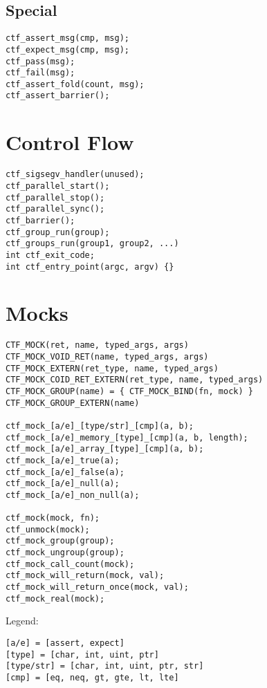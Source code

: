 \documentclass[12pt]{article}
\begin{document}
\subsection{Special}
\begin{verbatim}
ctf_assert_msg(cmp, msg);
ctf_expect_msg(cmp, msg);
ctf_pass(msg);
ctf_fail(msg);
ctf_assert_fold(count, msg);
ctf_assert_barrier();
\end{verbatim}
\section{Control Flow}
\begin{verbatim}
ctf_sigsegv_handler(unused);
ctf_parallel_start();
ctf_parallel_stop();
ctf_parallel_sync();
ctf_barrier();
ctf_group_run(group);
ctf_groups_run(group1, group2, ...)
int ctf_exit_code;
int ctf_entry_point(argc, argv) {}
\end{verbatim}
\section{Mocks}
\begin{verbatim}
CTF_MOCK(ret, name, typed_args, args)
CTF_MOCK_VOID_RET(name, typed_args, args)
CTF_MOCK_EXTERN(ret_type, name, typed_args)
CTF_MOCK_COID_RET_EXTERN(ret_type, name, typed_args)
CTF_MOCK_GROUP(name) = { CTF_MOCK_BIND(fn, mock) }
CTF_MOCK_GROUP_EXTERN(name)

ctf_mock_[a/e]_[type/str]_[cmp](a, b);
ctf_mock_[a/e]_memory_[type]_[cmp](a, b, length);
ctf_mock_[a/e]_array_[type]_[cmp](a, b);
ctf_mock_[a/e]_true(a);
ctf_mock_[a/e]_false(a);
ctf_mock_[a/e]_null(a);
ctf_mock_[a/e]_non_null(a);

ctf_mock(mock, fn);
ctf_unmock(mock);
ctf_mock_group(group);
ctf_mock_ungroup(group);
ctf_mock_call_count(mock);
ctf_mock_will_return(mock, val);
ctf_mock_will_return_once(mock, val);
ctf_mock_real(mock);
\end{verbatim}
Legend:
\begin{verbatim}
[a/e] = [assert, expect]
[type] = [char, int, uint, ptr]
[type/str] = [char, int, uint, ptr, str]
[cmp] = [eq, neq, gt, gte, lt, lte]
\end{verbatim}
\end{document}
